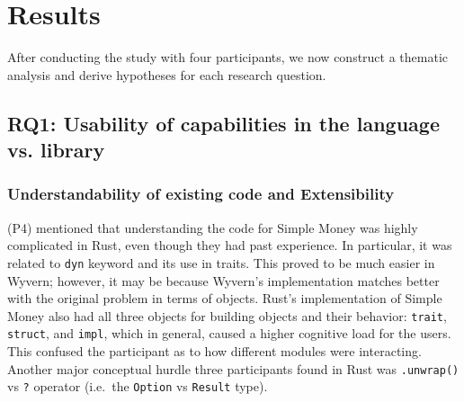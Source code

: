 \section{Results}\label{sec-results}

\noindent
After conducting the study with four participants, we now construct a thematic analysis and derive hypotheses for each research question. 

\subsection{RQ1: Usability of capabilities in the language vs. library}


\subsubsection{Understandability of existing code and Extensibility}

\noindent
(P4) mentioned that understanding the code for Simple Money was highly complicated in Rust, even though they had past experience. In particular, it was related to \texttt{dyn} keyword and its use in traits. This proved to be much easier in Wyvern; however, it may be because Wyvern's implementation matches better with the original problem in terms of objects. Rust's implementation of Simple Money also had all three objects for building objects and their behavior: \texttt{trait}, \texttt{struct}, and \texttt{impl}, which in general, caused a higher cognitive load for the users. This confused the participant as to how different modules were interacting. Another major conceptual hurdle three participants found in Rust  was \texttt{.unwrap()} vs \texttt{?} operator (i.e.\ the \texttt{Option} vs \texttt{Result} type).

